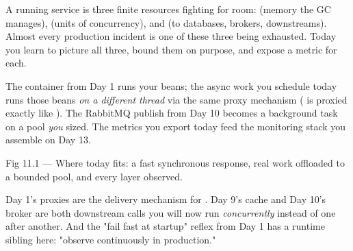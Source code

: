 \begin{keyidea}
A running service is three finite resources fighting for room:  (memory the GC manages),  (units of concurrency), and  (to databases, brokers, downstreams). Almost every production incident is one of these three being exhausted. Today you learn to picture all three, bound them on purpose, and expose a metric for each.
\end{keyidea}

 The container from Day 1 runs your beans; the async work you schedule today runs those beans \emph{on a different thread} via the same proxy mechanism ( is proxied exactly like ). The RabbitMQ publish from Day 10 becomes a background task on a pool \emph{you} sized. The metrics you export today feed the monitoring stack you assemble on Day 13.

\begin{wbfigure}{Fig 11.1 --- Where today fits: a fast synchronous response, real work offloaded to a bounded pool, and every layer observed.}
\end{wbfigure}

 Day 1's proxies are the delivery mechanism for . Day 9's cache and Day 10's broker are both downstream calls you will now run \emph{concurrently} instead of one after another. And the "fail fast at startup" reflex from Day 1 has a runtime sibling here: "observe continuously in production."

